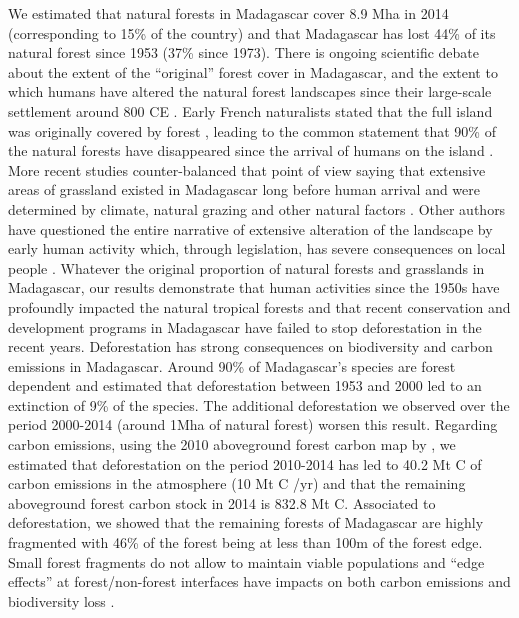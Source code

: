 \documentclass[a4paper, 12pt, leqno]{article} %
\begin{document}
We estimated that natural forests in Madagascar cover 8.9 Mha in 2014
(corresponding to 15\% of the country) and that Madagascar has lost 44\%
of its natural forest since 1953 (37\% since 1973). There is ongoing
scientific debate about the extent of the ``original'' forest cover in
Madagascar, and the extent to which humans have altered the natural
forest landscapes since their large-scale settlement around 800 CE
\citep{Burns2016, Cox2012}. Early French naturalists stated that the
full island was originally covered by forest
\citep{Humbert1927, Perrier1921}, leading to the common statement that
90\% of the natural forests have disappeared since the arrival of humans
on the island \citep{Kull2000}. More recent studies counter-balanced
that point of view saying that extensive areas of grassland existed in
Madagascar long before human arrival and were determined by climate,
natural grazing and other natural factors
\citep[\citet{Vorontsova2017}]{Virah-Sawmy2009}. Other authors have
questioned the entire narrative of extensive alteration of the landscape
by early human activity which, through legislation, has severe
consequences on local people \citep{Klein2002, Kull2000}. Whatever the
original proportion of natural forests and grasslands in Madagascar, our
results demonstrate that human activities since the 1950s have
profoundly impacted the natural tropical forests and that recent
conservation and development programs in Madagascar have failed to stop
deforestation in the recent years. Deforestation has strong consequences
on biodiversity and carbon emissions in Madagascar. Around 90\% of
Madagascar's species are forest dependent
\citep{Allnutt2008, Goodman2005} and \citet{Allnutt2008} estimated that
deforestation between 1953 and 2000 led to an extinction of 9\% of the
species. The additional deforestation we observed over the period
2000-2014 (around 1Mha of natural forest) worsen this result. Regarding
carbon emissions, using the 2010 aboveground forest carbon map by
\citet{Vieilledent2016}, we estimated that deforestation on the period
2010-2014 has led to 40.2 Mt C of carbon emissions in the atmosphere (10
Mt C /yr) and that the remaining aboveground forest carbon stock in 2014
is 832.8 Mt C. Associated to deforestation, we showed that the remaining
forests of Madagascar are highly fragmented with 46\% of the forest
being at less than 100m of the forest edge. Small forest fragments do
not allow to maintain viable populations and ``edge effects'' at
forest/non-forest interfaces have impacts on both carbon emissions
\citep{Brinck2017} and biodiversity loss \citep{Gibson2013, Murcia1995}.
\end{document}
